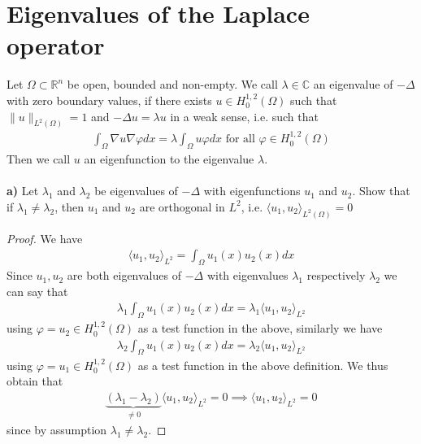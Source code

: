 \documentclass[12pt,a4paper]{article}
\theoremstyle{definition}
\begin{document}
\section{Eigenvalues of the Laplace operator}
Let $\Omega \subset \mathbb{R}^n$ be open, bounded and non-empty. We call $\lambda \in \mathbb{C}$ an eigenvalue of $- \Delta$ with zero boundary values, if there exists $u \in H_0^{1,2}(\Omega)$ such that $\|u\|_{L^2( \Omega)} =1$ and $- \Delta u = \lambda u$ in a weak sense, i.e. such that
\begin{align*}
\int_\Omega \nabla u \nabla \varphi dx = \lambda \int_\Omega u \varphi dx \text{ for all } \varphi \in H_0^{1,2}( \Omega)
\end{align*}
Then we call $u$ an eigenfunction to the eigenvalue $\lambda$. 
\\\\
\textbf{a)} Let $\lambda_1$ and $\lambda_2$ be eigenvalues of $- \Delta$ with eigenfunctions $u_1$ and $u_2$. Show that if $\lambda_1 \neq \lambda_2$, then $u_1$ and $u_2$ are orthogonal in $L^2$, i.e. $\langle u_1, u_2 \rangle_{L^2( \Omega)} = 0$ 
\begin{proof}
We have
\begin{align*}
\langle u_1, u_2 \rangle_{L^2} = \int_\Omega u_1(x) u_2(x) dx 
\end{align*}
Since $u_1, u_2$ are both eigenvalues of $- \Delta$ with eigenvalues $\lambda_1$ respectively $\lambda_2$ we can say that 
\begin{align*}
\lambda_1 \int_\Omega u_1(x) u_2(x)dx = \lambda_1 \langle u_1, u_2 \rangle_{L^2}
\end{align*}
using $\varphi=u_2 \in H_0^{1,2}( \Omega)$ as a test function in the above, similarly we have 
\begin{align*}
\lambda_2 \int_\Omega u_1(x) u_2(x)dx = \lambda_2 \langle u_1, u_2 \rangle_{L^2} 
\end{align*}
using $\varphi = u_1 \in H_0^{1,2}(\Omega)$ as a test function in the above definition. We thus obtain that
\begin{align*}
\underbrace{( \lambda_1 - \lambda_2)}_{ \neq 0} \langle u_1, u_2 \rangle_{L^2} = 0  \implies \langle u_1, u_2 \rangle_{L^2} =0 
\end{align*}
since by assumption $\lambda_1 \neq \lambda_2$. 
\end{proof}
\end{document}
